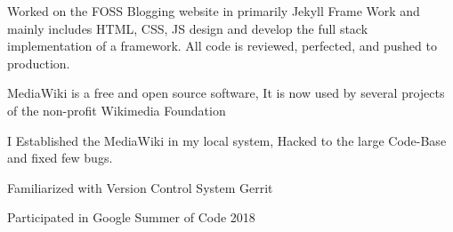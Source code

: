 \documentclass[]{deedy-resume-openfont}
\begin{document}
\hfill
\begin{minipage}[t]{0.66\textwidth} 




\begin{tightemize}
\item Worked on the FOSS Blogging website in primarily Jekyll Frame Work and mainly includes HTML, CSS, JS design and develop the full stack implementation of a framework. All code is reviewed, perfected, and pushed to production.\end{tightemize}
\sectionsep

\begin{tightemize}
\item MediaWiki is a free and open source software, It is now used by several projects of the non-profit Wikimedia Foundation\item I Established the MediaWiki in my local system, Hacked to the large Code-Base and fixed few bugs.\item Familiarized with Version Control System Gerrit \item Participated in Google Summer of Code 2018 \end{tightemize}
\sectionsep




\end{minipage}
\end{document}
